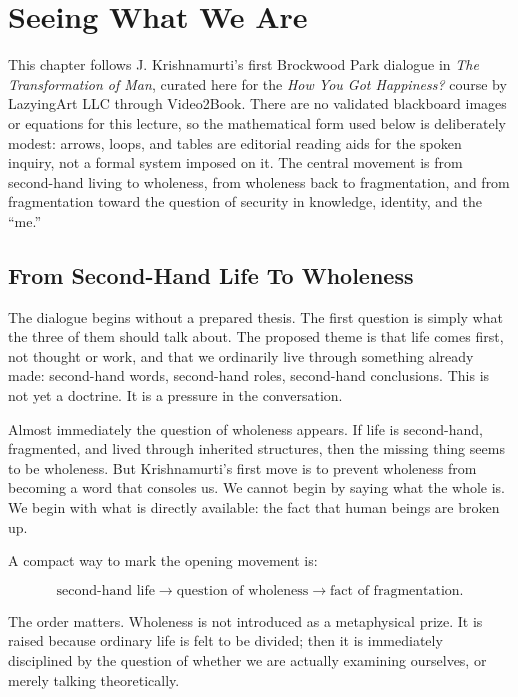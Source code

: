\chapter{Seeing What We Are}

This chapter follows J. Krishnamurti's first Brockwood Park dialogue in \emph{The Transformation of Man}, curated here for the \emph{How You Got Happiness?} course by LazyingArt LLC through Video2Book. There are no validated blackboard images or equations for this lecture, so the mathematical form used below is deliberately modest: arrows, loops, and tables are editorial reading aids for the spoken inquiry, not a formal system imposed on it. The central movement is from second-hand living to wholeness, from wholeness back to fragmentation, and from fragmentation toward the question of security in knowledge, identity, and the ``me.''

\section{From Second-Hand Life To Wholeness}

The dialogue begins without a prepared thesis. The first question is simply what the three of them should talk about. The proposed theme is that life comes first, not thought or work, and that we ordinarily live through something already made: second-hand words, second-hand roles, second-hand conclusions. This is not yet a doctrine. It is a pressure in the conversation.

Almost immediately the question of wholeness appears. If life is second-hand, fragmented, and lived through inherited structures, then the missing thing seems to be wholeness. But Krishnamurti's first move is to prevent wholeness from becoming a word that consoles us. We cannot begin by saying what the whole is. We begin with what is directly available: the fact that human beings are broken up.

A compact way to mark the opening movement is:

\begin{equation}
\text{second-hand life}
\longrightarrow
\text{question of wholeness}
\longrightarrow
\text{fact of fragmentation}.
\end{equation}

The order matters. Wholeness is not introduced as a metaphysical prize. It is raised because ordinary life is felt to be divided; then it is immediately disciplined by the question of whether we are actually examining ourselves, or merely talking theoretically.

